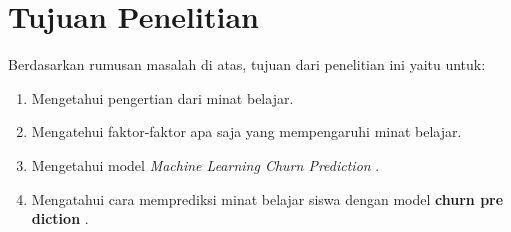 \section{Tujuan Penelitian}

Berdasarkan rumusan masalah di atas, tujuan dari penelitian ini yaitu untuk:
\begin{enumerate}
	\item Mengetahui pengertian dari minat belajar.
	
	\item Mengatehui faktor-faktor apa saja yang mempengaruhi minat belajar.
	\item Mengetahui model \textit{Machine Learning Churn Prediction} .
	\item Mengatahui cara memprediksi minat belajar siswa dengan model \textbf{churn pre
diction} .
\end{enumerate}
